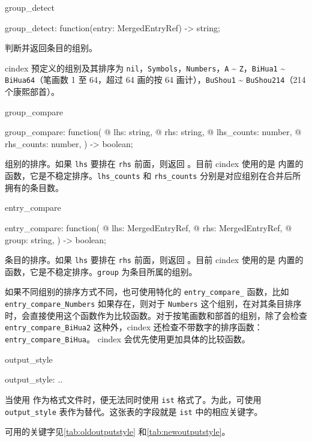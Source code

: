 \documentclass[class=article,doc={kv-usage}]{cusdoc}
\newcommand*\LUA{\texorpdfstring{\textcon{lua}}{lua}}
\begin{document}
\begin{luadoc}{group_detect}
  \begin{luasyntax}
    group_detect: function(entry: MergedEntryRef) -> string;
  \end{luasyntax}
判断并返回条目的组别。

cindex 预定义的组别及其排序为 \texttt{nil}，\texttt{Symbols}，\texttt{Numbers}，\texttt{A} \~{} \texttt{Z}，\texttt{BiHua1} \~{} \texttt{BiHua64}（笔画数 1 至 64，超过 64 画的按 64 画计），\texttt{BuShou1} \~{} \texttt{BuShou214}（214 个康熙部首）。
\end{luadoc}

\begin{luadoc}{group_compare}
  \begin{luasyntax}
    group_compare: function(
   @  lhs: string,
   @  rhs: string,
   @  lhs_counts: number,
   @  rhs_counts: number,
    ) -> boolean;
  \end{luasyntax}
组别的排序。如果 \texttt{lhs} 要排在 \texttt{rhs} 前面，则返回 。目前 cindex 使用的是 \LUA 内置的  函数，它是不稳定排序。\texttt{lhs_counts} 和 \texttt{rhs_counts} 分别是对应组别在合并后所拥有的条目数。
\end{luadoc}

\begin{luadoc}{entry_compare}
  \begin{luasyntax}
    entry_compare: function(
   @  lhs: MergedEntryRef,
   @  rhs: MergedEntryRef,
   @  group: string,
    ) -> boolean;
  \end{luasyntax}
条目的排序。如果 \texttt{lhs} 要排在 \texttt{rhs} 前面，则返回 。目前 cindex 使用的是 \LUA 内置的  函数，它是不稳定排序。\texttt{group} 为条目所属的组别。

如果不同组别的排序方式不同，也可使用特化的 \texttt{entry_compare_} 函数，比如 \texttt{entry_compare_Numbers} 如果存在，则对于 \texttt{Numbers} 这个组别，在对其条目排序时，会直接使用这个函数作为比较函数。对于按笔画数和部首的组别，除了会检查 \texttt{entry_compare_BiHua2} 这种外，cindex 还检查不带数字的排序函数：\texttt{entry_compare_BiHua}。 cindex 会优先使用更加具体的比较函数。
\end{luadoc}

\begin{luadoc}{output_style}
  \begin{luasyntax}
    output_style: { .. }
  \end{luasyntax}
当使用 \LUA 作为格式文件时，便无法同时使用 \texttt{ist} 格式了。为此，可使用 \texttt{output_style} 表作为替代。这张表的字段就是 \texttt{ist} 中的相应关键字。

可用的关键字见\cref{tab:oldoutputstyle} 和\cref{tab:newoutputstyle}。
\end{luadoc}
\end{document}
